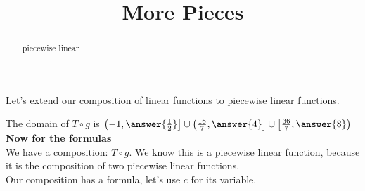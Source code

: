 \documentclass{ximera}
\title{More Pieces}
\begin{document}
\begin{abstract}
piecewise linear
\end{abstract}
\maketitle







Let's extend our composition of linear functions to piecewise linear functions.








The domain of $T \circ g$ is $\left( -1, \answer{\frac{1}{2}} \right] \cup \left( \frac{16}{7}, \answer{4} \right] \cup \left[ \frac{36}{7}, \answer{8} \right)$ \\


\textbf{Now for the formulas} \\


We have a composition: $T \circ g$.  We know this is a piecewise linear function, because it is the composition of two piecewise linear functions. \\

Our composition has a formula, let's use $c$ for its variable. \\
\end{document}
